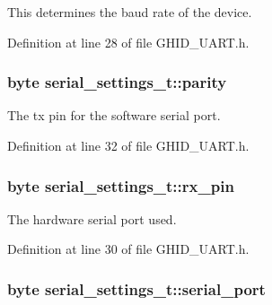 \-This determines the baud rate of the device. 



\-Definition at line 28 of file \-G\-H\-I\-D\-\_\-\-U\-A\-R\-T.\-h.

\hypertarget{structserial__settings__t_a330dd78eab42531854bd6d83e5f9d495}{
\subsubsection[{parity}]{\setlength{\rightskip}{0pt plus 5cm}byte {\bf serial\-\_\-settings\-\_\-t\-::parity}}}\label{structserial__settings__t_a330dd78eab42531854bd6d83e5f9d495}


\-The tx pin for the software serial port. 



\-Definition at line 32 of file \-G\-H\-I\-D\-\_\-\-U\-A\-R\-T.\-h.

\hypertarget{structserial__settings__t_a35ec7f2933e8dd3265de62ece1a2073c}{
\subsubsection[{rx\-\_\-pin}]{\setlength{\rightskip}{0pt plus 5cm}byte {\bf serial\-\_\-settings\-\_\-t\-::rx\-\_\-pin}}}\label{structserial__settings__t_a35ec7f2933e8dd3265de62ece1a2073c}


\-The hardware serial port used. 



\-Definition at line 30 of file \-G\-H\-I\-D\-\_\-\-U\-A\-R\-T.\-h.

\hypertarget{structserial__settings__t_abd1e231f87b8a7d963c09cb88a5aa5b6}{
\subsubsection[{serial\-\_\-port}]{\setlength{\rightskip}{0pt plus 5cm}byte {\bf serial\-\_\-settings\-\_\-t\-::serial\-\_\-port}}}\label{structserial__settings__t_abd1e231f87b8a7d963c09cb88a5aa5b6}


